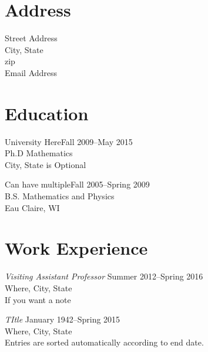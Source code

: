 \documentclass[10pt]{article}
\begin{document}
\noindent























\section{\textbf{\large Address}}Street Address\\City, State\\zip\\Email Address\\\vspace{0.5\baselineskip}





\section{\textbf{\large Education}}University Here\hfill Fall 2009--May 2015\\Ph.D Mathematics\\City, State is Optional\vspace{0.5\baselineskip}


Can have multiple\hfill Fall 2005--Spring 2009\\B.S. Mathematics and Physics\\Eau Claire, WI\vspace{0.5\baselineskip}





\section{\textbf{\large Work Experience}}\textit{Visiting Assistant Professor} \hfill Summer 2012--Spring 2016\\Where, City, State\\If you want a note\vspace{0.5\baselineskip}


\textit{TItle} \hfill January 1942--Spring 2015\\Where, City, State\\Entries are sorted automatically according to end date.\vspace{0.5\baselineskip}
\end{document}
